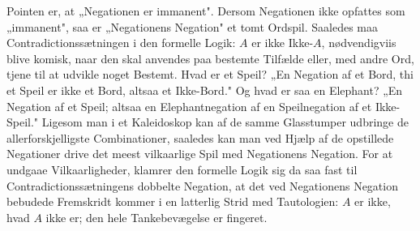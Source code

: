 \documentclass[12pt]{book}
\newcommand{\opage}[1]{\marginnote{\footnotesize\textit{[#1]}}}
\begin{document}
Pointen er, at „Negationen er immanent". Dersom Negationen ikke opfattes som „immanent", saa
er „Negationens Negation" et tomt Ordspil. Saaledes maa Contradictionssætningen i den formelle
Logik: $A$ er ikke Ikke-$A$, nødvendigviis blive komisk, naar den skal anvendes paa bestemte
Tilfælde eller, med andre Ord, tjene til at udvikle noget Bestemt. Hvad er et Speil? „En
Negation af et Bord, thi et Speil er ikke et Bord, altsaa et Ikke-Bord." Og hvad er saa en
Elephant? „En Negation af et Speil; altsaa en Elephantnegation af en Speilnegation af et
\opage{148} Ikke-Speil." Ligesom man i et Kaleidoskop kan af de samme Glasstumper udbringe de
allerforskjelligste Combinationer, saaledes kan man ved Hjælp af de opstillede Negationer
drive det meest vilkaarlige Spil med Negationens Negation. For at undgaae Vilkaarligheder,
klamrer den formelle Logik sig da saa fast til Contradictionssætningens dobbelte Negation, at
det ved Negationens Negation bebudede Fremskridt kommer i en latterlig Strid med Tautologien:
$A$ er ikke, hvad $A$ ikke er; den hele Tankebevægelse er fingeret.
\end{document}
